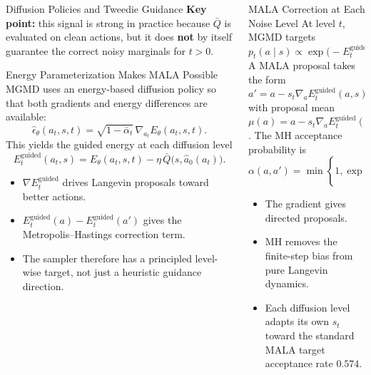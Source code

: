 \documentclass[final,hyperref={pdfpagelabels=false}]{beamer}
\newlength{\colwidth}
\begin{document}
\begin{frame}[t]
\begin{columns}[t]
\begin{column}{\colwidth}
\begin{block}{\Large Diffusion Policies and Tweedie Guidance}
\vspace{0.3em}
\textbf{Key point:}
this signal is strong in practice because $\bar Q$ is evaluated on clean actions, but it does \textbf{not} by itself guarantee the correct noisy marginals for $t>0$.
\end{block}

\vspace{0.8cm}

\begin{block}{\Large Energy Parameterization Makes MALA Possible}
\small
MGMD uses an energy-based diffusion policy so that both gradients and energy differences are available:
\[
\hat\epsilon_\theta(a_t,s,t)=\sqrt{1-\bar\alpha_t}\,\nabla_{a_t}E_\theta(a_t,s,t).
\]
This yields the guided energy at each diffusion level
\[
E_t^{\mathrm{guided}}(a_t,s)=E_\theta(a_t,s,t)-\eta\,\bar Q\!\bigl(s,\hat a_0(a_t)\bigr).
\]

\vspace{0.3em}
\begin{itemize}
    \item $\nabla E_t^{\mathrm{guided}}$ drives Langevin proposals toward better actions.
    \item $E_t^{\mathrm{guided}}(a)-E_t^{\mathrm{guided}}(a')$ gives the Metropolis--Hastings correction term.
    \item The sampler therefore has a principled level-wise target, not just a heuristic guidance direction.
\end{itemize}
\end{block}
\end{column}

\begin{column}{\colwidth}
\begin{block}{\Large MALA Correction at Each Noise Level}
\small
At level $t$, MGMD targets
\[
p_t(a\mid s)\propto\exp\!\bigl(-E_t^{\mathrm{guided}}(a,s)\bigr).
\]
A MALA proposal takes the form
\[
a' = a-s_t\nabla_a E_t^{\mathrm{guided}}(a,s)+\sqrt{2s_t}\,z,
\qquad z\sim\mathcal{N}(0,I),
\]
with proposal mean $\mu(a)=a-s_t\nabla_a E_t^{\mathrm{guided}}(a,s)$. The MH acceptance probability is
\[
\alpha(a,a')=\min\!\left\{1,\exp\!\left[
E_t^{\mathrm{guided}}(a,s)-E_t^{\mathrm{guided}}(a',s)
+\frac{\|a'-\mu(a)\|^2-\|a-\mu(a')\|^2}{4s_t}
\right]\right\}.
\]

\vspace{0.3em}
\begin{itemize}
    \item The gradient gives directed proposals.
    \item MH removes the finite-step bias from pure Langevin dynamics.
    \item Each diffusion level adapts its own $s_t$ toward the standard MALA target acceptance rate $0.574$.
\end{itemize}


\end{block}
\end{column}
\end{columns}
\end{frame}
\end{document}
